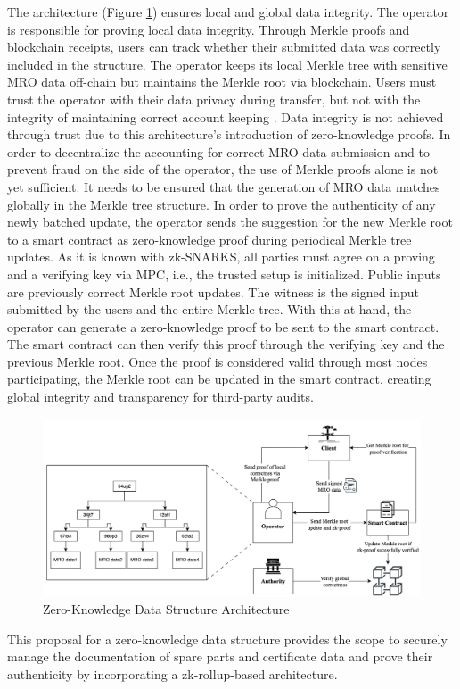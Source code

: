 The architecture (Figure \ref{fig:arch}) ensures local and global data integrity. The operator is responsible for proving local data integrity. Through Merkle proofs and blockchain receipts, users can track whether their submitted data was correctly included in the structure. The operator keeps its local Merkle tree with sensitive MRO data off-chain but maintains the Merkle root via blockchain. Users must trust the operator with their data privacy during transfer, but not with the integrity of maintaining correct account keeping \citep{sedlemeirgrenenergy}. Data integrity is not achieved through trust due to this architecture's introduction of zero-knowledge proofs. In order to decentralize the accounting for correct MRO data submission and to prevent fraud on the side of the operator, the use of Merkle proofs alone is not yet sufficient. It needs to be ensured that the generation of MRO data matches globally in the Merkle tree structure. In order to prove the authenticity of any newly batched update, the operator sends the suggestion for the new Merkle root to a smart contract as zero-knowledge proof during periodical Merkle tree updates. As it is known with zk-SNARKS, all parties must agree on a proving and a verifying key via MPC, i.e., the trusted setup is initialized. Public inputs are previously correct Merkle root updates. The witness is the signed input submitted by the users and the entire Merkle tree. With this at hand, the operator can generate a zero-knowledge proof to be sent to the smart contract. The smart contract can then verify this proof through the verifying key and the previous Merkle root. Once the proof is considered valid through most nodes participating, the Merkle root can be updated in the smart contract, creating global integrity and transparency for third-party audits. 

\begin{figure}[hbt]
	\centering
		\includegraphics[width=1.0\textwidth]{Pictures/architecture.png}
	\caption{Zero-Knowledge Data Structure Architecture}
	\label{fig:arch}
\end{figure}
This proposal for a zero-knowledge data structure provides the scope to securely manage the documentation of spare parts and certificate data and prove their authenticity by incorporating a zk-rollup-based architecture.

